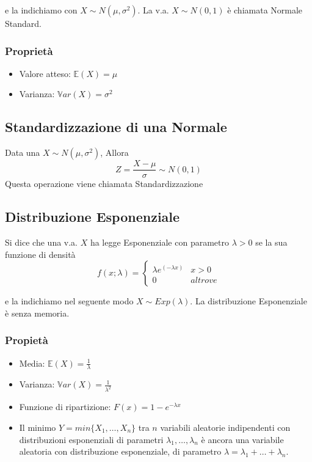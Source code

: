 \documentclass[a4paper]{report}
\begin{document}
  e la indichiamo con $X \sim N(\mu, \sigma^2)$. La v.a. $X \sim N(0,1)$ è chiamata Normale Standard.

  \subsubsection{Proprietà}
  \begin{itemize}
    \item Valore atteso: $\mathbb{E}(X) = \mu$
    \item Varianza: $\mathbb{V}ar(X) = \sigma^2$
  \end{itemize}

  \subsection{Standardizzazione di una Normale}
  Data una $X \sim N(\mu,\sigma^2)$, Allora
  \[ Z = \frac{X-\mu}{\sigma} \sim N(0,1) \]
  Questa operazione viene chiamata Standardizzazione


  \subsection{Distribuzione Esponenziale}
  Si dice che una v.a. $X$ ha legge Esponenziale con parametro $\lambda >0$ se la sua funzione di densità
  \[
    f(x;\lambda) =
    \begin{cases}
      \lambda e^{(-\lambda x)} & x > 0 \\
      0 & altrove
    \end{cases}
  \]

  e la indichiamo nel seguente modo $X \sim Exp(\lambda)$. La distribuzione Esponenziale è senza memoria.
  \subsubsection{Propietà}
  \begin{itemize}
    \item Media: $\mathbb{E}(X) = \frac{1}{\lambda}$
    \item Varianza: $\mathbb{V}ar(X) = \frac{1}{\lambda^2}$
    \item Funzione di ripartizione: $F(x) = 1-e^{-\lambda x}$
    \item Il minimo $Y = min\{X_1,\dots,X_n\} $ tra $n$ variabili aleatorie indipendenti con distribuzioni esponenziali di parametri $ \lambda_1,\dots,\lambda_n $ è ancora una variabile aleatoria con distribuzione esponenziale, di parametro $ \lambda = \lambda_1 + \dots + \lambda_n$.
  \end{itemize}
\end{document}
